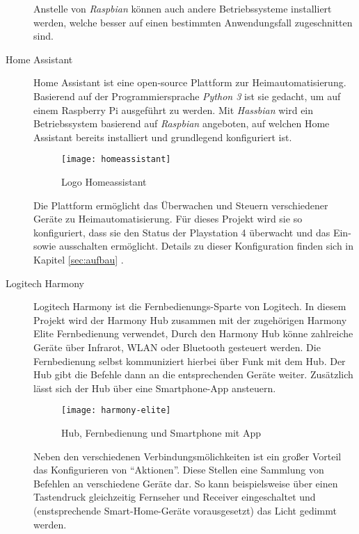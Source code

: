 \begin{description}
        Anstelle von \textit{Raspbian} können auch andere Betriebssysteme installiert werden,
        welche besser auf einen bestimmten Anwendungsfall zugeschnitten sind.

    \item[Home Assistant \cite{HomeAssi51:online}]
        Home Assistant ist eine open-source Plattform zur Heimautomatisierung.
        Basierend auf der Programmiersprache \textit{Python 3} ist sie gedacht,
        um auf einem Raspberry Pi ausgeführt zu werden.
        Mit \textit{Hassbian} wird ein Betriebssystem basierend auf \textit{Raspbian} angeboten,
        auf welchen Home Assistant bereits installiert und grundlegend konfiguriert ist.

        \begin{figure}[h!]
            \centering
            \texttt{[image: homeassistant]}
            \caption{Logo Homeassistant}\label{fig:homeassistant}
        \end{figure}

        Die Plattform ermöglicht das Überwachen und Steuern verschiedener Geräte zu Heimautomatisierung.
        Für dieses Projekt wird sie so konfiguriert,
        dass sie den Status der Playstation 4 überwacht und das Ein- sowie ausschalten ermöglicht.
        Details zu dieser Konfiguration finden sich in Kapitel \ref{sec:aufbau} \textit{}.

    \item[Logitech Harmony \cite{HarmonyH15:online}]
        Logitech Harmony ist die Fernbedienungs-Sparte von Logitech.
        In diesem Projekt wird der Harmony Hub zusammen mit der zugehörigen Harmony Elite Fernbedienung verwendet,
        Durch den Harmony Hub könne zahlreiche Geräte über Infrarot, WLAN oder Bluetooth gesteuert werden.
        Die Fernbedienung selbst kommuniziert hierbei über Funk \cite{HowToPoi90:online} mit dem Hub.
        Der Hub gibt die Befehle dann an die entsprechenden Geräte weiter.
        Zusätzlich lässt sich der Hub über eine Smartphone-App ansteuern.

        \begin{figure}[h!]
            \centering
            \texttt{[image: harmony-elite]}
            \caption{Hub, Fernbedienung und Smartphone mit App}\label{fig:harmony}
        \end{figure}

        Neben den verschiedenen Verbindungsmölichkeiten ist ein großer Vorteil das Konfigurieren von \enquote{Aktionen}.
        Diese Stellen eine Sammlung von Befehlen an verschiedene Geräte dar.
        So kann beispielsweise über einen Tastendruck gleichzeitig Fernseher und Receiver eingeschaltet
        und (enstsprechende Smart-Home-Geräte vorausgesetzt) das Licht gedimmt werden.
\end{description}
